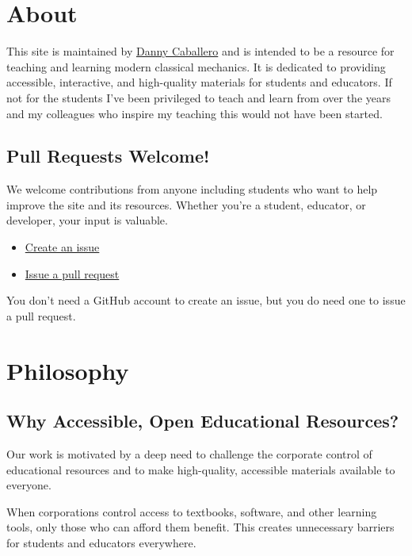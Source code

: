 \section{About}\label{about}

This site is maintained by \href{https://dannycab.github.io/}{Danny
Caballero} and is intended to be a resource for teaching and learning
modern classical mechanics. It is dedicated to providing accessible,
interactive, and high-quality materials for students and educators. If
not for the students I've been privileged to teach and learn from over
the years and my colleagues who inspire my teaching this would not have
been started.

\subsection{Pull Requests Welcome!}\label{pull-requests-welcome}

We welcome contributions from anyone including students who want to help
improve the site and its resources. Whether you're a student, educator,
or developer, your input is valuable.

\begin{itemize}
\tightlist
\item
  \href{https://github.com/dannycab/modern-classical-mechanics/issues/new}{Create
  an issue}
\item
  \href{https://github.com/dannycab/modern-classical-mechanics/pulls}{Issue
  a pull request}
\end{itemize}

You don't need a GitHub account to create an issue, but you do need one
to issue a pull request.

\section{Philosophy}\label{philosophy}

\subsection{Why Accessible, Open Educational
Resources?}\label{why-accessible-open-educational-resources}

Our work is motivated by a deep need to challenge the corporate control
of educational resources and to make high-quality, accessible materials
available to everyone.

When corporations control access to textbooks, software, and other
learning tools, only those who can afford them benefit. This creates
unnecessary barriers for students and educators everywhere.

